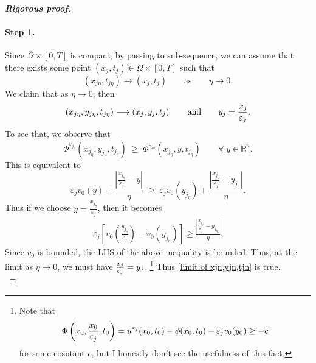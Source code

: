 \documentclass[12pt, oneside]{amsart}  	%
\begin{document}
\begin{proof}[\textbf{Rigorous proof}]
\paragraph{\textbf{Step 1.}} Since $\overline{\Omega}\times [0,T]$ is compact, by passing to sub-sequence, we can assume that there exists some point $\left(x_j,t_j\right)\in \overline{\Omega}\times[0,T]$ such that
\begin{equation*}
\left(x_{j\eta},t_{j\eta}\right)\longrightarrow \left(x_j,t_j\right)\qquad\text{as}\qquad \eta\longrightarrow 0.
\end{equation*}
We claim that as $\eta\longrightarrow 0$, then
\begin{equation} \label{limit of xjn,yjn,tjn}
\left(x_{j\eta}, y_{j\eta}, t_{j\eta}\right)\longrightarrow \left(x_j, y_j, t_j\right) \qquad\text{and}\qquad y_j=\frac{x_j}{\varepsilon_j}.
\end{equation}
To see that, we observe that
\begin{equation*}
\Phi^{\varepsilon_{j_\eta}}\left(x_{j_\eta}, y_{j_\eta}, t_{j_\eta}\right) \;\geq\; \Phi^{\varepsilon_{j_\eta}}\left(x_{j_\eta}, y, t_{j_\eta}\right) \qquad\forall \;y \in \mathbb{R}^n.
\end{equation*}
This is equivalent to
\begin{equation*}
\varepsilon_j v_0\left(y\right) + \frac{\left|\frac{x_{j_\eta}}{\varepsilon_j} - y\right|}{\eta} \;\geq\; \varepsilon_j v_0\left(y_{j_\eta}\right) + \frac{\left|\frac{x_{j_\eta}}{\varepsilon_j} - y_{j_\eta} \right|}{\eta}.
\end{equation*}
Thus if we choose $y = \frac{x_{j_\eta}}{\varepsilon_j}$, then it becomes
\begin{align*}
\varepsilon_j\left[v_0\left(\frac{y_{j_\eta}}{\varepsilon_j}\right) - v_0\left(y_{j_\eta}\right)\right] \geq \frac{\left|\frac{x_{j_\eta}}{\varepsilon_j} - y_{j_\eta} \right|}{\eta}.
\end{align*}
Since $v_0$ is bounded, the LHS of the above inequality is bounded. Thus, at the limit as $\eta \longrightarrow 0$, we must have $\frac{x_j}{\varepsilon_j}=y_j$. \footnote{Note that $$\Phi\left(x_0,\frac{x_0}{\varepsilon_j},t_0\right) =  u^{\varepsilon_j}(x_0, t_0) - \phi(x_0, t_0) - \varepsilon_j v_0(y_0) \geq -c$$ for some cosntant $c$, but I honestly don't see the usefulness of this fact.} Thus \eqref{limit of xjn,yjn,tjn} is true.\\


\end{proof}
\end{document}
